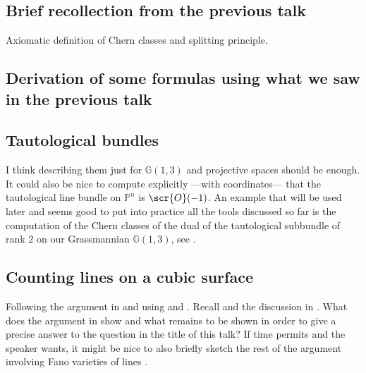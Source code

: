 \documentclass[A4paper, 12pt, british, reqno]{amsart}
\renewcommand{\O}{\scr{O}} %
\newcommand{\bbG}{\mathbb{G}}
\renewcommand{\P}{\mathbb{P}} %
\theoremstyle{plain}
\theoremstyle{definition}
\theoremstyle{remark}
\theoremstyle{plain}
\theoremstyle{definition}
\theoremstyle{remark}
\theoremstyle{plain}
\theoremstyle{definition}
\theoremstyle{remark}
\begin{document}
\subsection{Brief recollection from the previous talk}
Axiomatic definition of Chern classes and splitting principle.

\subsection{Derivation of some formulas using what we saw in the previous talk \cite[\S 5.5]{eh16}}

\subsection{Tautological bundles \cite[\S 5.6]{eh16}}
I think describing them just for $\bbG(1,3)$ and projective spaces should be enough.
It could also be nice to compute explicitly ---with coordinates--- that the tautological line bundle on $\P^{n}$ is $\O(-1)$.
An example that will be used later and seems good to put into practice all the tools discussed so far is the computation of the Chern classes of the dual of the tautological subbundle of rank $2$ on our Grassmannian $\bbG(1,3)$, see \cite[\S 5.6.2]{eh16}.

\subsection{Counting lines on a cubic surface}
Following the argument in \cite[Thm.~5.1]{eh16} and using \cite[\S 5.6.2]{eh16} and \cite[\S 6.2.1]{eh16}.
Recall  and the discussion in \cite[\S 3.1.2]{eh16}.
What does the argument in \cite[Thm.~5.1]{eh16} show and what remains to be shown in order to give a precise answer to the question in the title of this talk?
If time permits and the speaker wants, it might be nice to also briefly sketch the rest of the argument involving Fano varieties of lines \cite[\S 6.1--6.2]{eh16}.



\vfill
\end{document}

